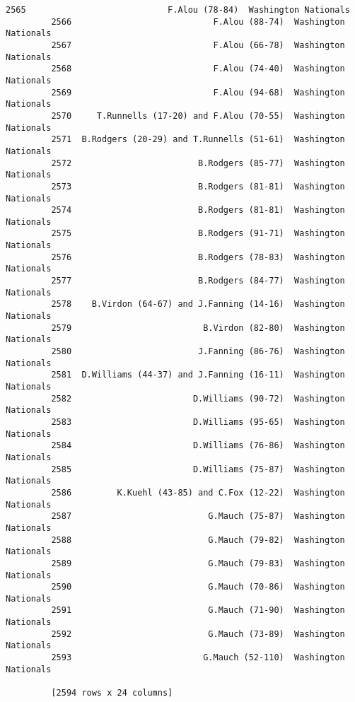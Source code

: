\documentclass[11pt]{article}
\begin{document}
\begin{Verbatim}[commandchars=\\\{\}]
         2565                            F.Alou (78-84)  Washington Nationals  
         2566                            F.Alou (88-74)  Washington Nationals  
         2567                            F.Alou (66-78)  Washington Nationals  
         2568                            F.Alou (74-40)  Washington Nationals  
         2569                            F.Alou (94-68)  Washington Nationals  
         2570     T.Runnells (17-20) and F.Alou (70-55)  Washington Nationals  
         2571  B.Rodgers (20-29) and T.Runnells (51-61)  Washington Nationals  
         2572                         B.Rodgers (85-77)  Washington Nationals  
         2573                         B.Rodgers (81-81)  Washington Nationals  
         2574                         B.Rodgers (81-81)  Washington Nationals  
         2575                         B.Rodgers (91-71)  Washington Nationals  
         2576                         B.Rodgers (78-83)  Washington Nationals  
         2577                         B.Rodgers (84-77)  Washington Nationals  
         2578    B.Virdon (64-67) and J.Fanning (14-16)  Washington Nationals  
         2579                          B.Virdon (82-80)  Washington Nationals  
         2580                         J.Fanning (86-76)  Washington Nationals  
         2581  D.Williams (44-37) and J.Fanning (16-11)  Washington Nationals  
         2582                        D.Williams (90-72)  Washington Nationals  
         2583                        D.Williams (95-65)  Washington Nationals  
         2584                        D.Williams (76-86)  Washington Nationals  
         2585                        D.Williams (75-87)  Washington Nationals  
         2586         K.Kuehl (43-85) and C.Fox (12-22)  Washington Nationals  
         2587                           G.Mauch (75-87)  Washington Nationals  
         2588                           G.Mauch (79-82)  Washington Nationals  
         2589                           G.Mauch (79-83)  Washington Nationals  
         2590                           G.Mauch (70-86)  Washington Nationals  
         2591                           G.Mauch (71-90)  Washington Nationals  
         2592                           G.Mauch (73-89)  Washington Nationals  
         2593                          G.Mauch (52-110)  Washington Nationals  
         
         [2594 rows x 24 columns]
\end{Verbatim}
            

    
    
    
    
\end{document}
